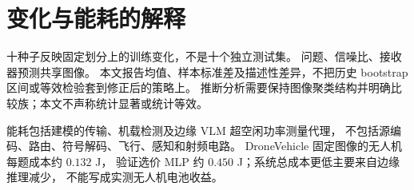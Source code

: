 \section{变化与能耗的解释}
十种子反映固定划分上的训练变化，不是十个独立测试集。
问题、信噪比、接收器预测共享图像。
本文报告均值、样本标准差及描述性差异，不把历史 bootstrap 区间或等效检验套到修正后的策略上。
推断分析需要保持图像聚类结构并明确比较族；本文不声称统计显著或统计等效。

能耗包括建模的传输、机载检测及边缘 VLM 超空闲功率测量代理，
不包括源编码、路由、符号解码、飞行、感知和射频电路。
DroneVehicle 固定图像的无人机每题成本约 $0.132$ J，
验证选价 MLP 约 $0.450$ J；系统总成本更低主要来自边缘推理减少，
不能写成实测无人机电池收益。
